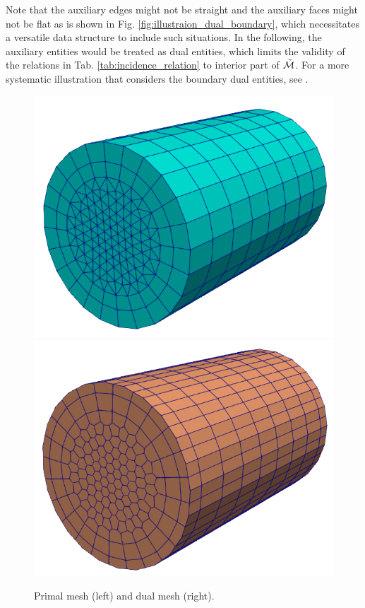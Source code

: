\documentclass{article}
\begin{document}
Note that the auxiliary edges might not be straight and the auxiliary faces might not be flat as is shown in Fig. \ref{fig:illustraion_dual_boundary}, which necessitates a versatile data structure to include such situations. In the following, the auxiliary entities would be treated as dual entities, which limits the validity of the relations in Tab. \ref{tab:incidence_relation} to interior part of $\Tilde{\mathcal{M}}$. For a more systematic illustration that considers the boundary dual entities, see \cite[][Sec. 5]{hip_1999}.

\begin{figure}
    \centering
    \includegraphics[scale=0.3]{primal_mesh.png}
    \hspace{1cm}
    \includegraphics[scale=0.3]{dual_mesh.png}
    \caption{Primal mesh (left) and dual mesh (right).}
    \label{fig:primal_dual_meshes}
\end{figure}
\end{document}

